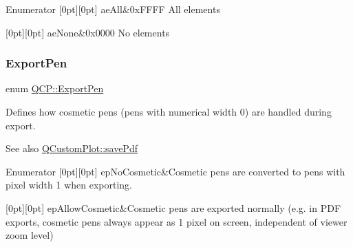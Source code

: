 \begin{DoxyEnumFields}{Enumerator}
[0pt][0pt]{}\mbox{\label{namespace_q_c_p_ae55dbe315d41fe80f29ba88100843a0caa897c232a0ffc8368e7c100ffc59ef31}} 
ae\+All&{\ttfamily 0x\+F\+F\+FF} All elements \\
\hline

[0pt][0pt]{}\mbox{\label{namespace_q_c_p_ae55dbe315d41fe80f29ba88100843a0caa9e90d81896358757d94275aeaa58f6a}} 
ae\+None&{\ttfamily 0x0000} No elements \\
\hline

\end{DoxyEnumFields}
\mbox{\label{namespace_q_c_p_a17844f19e1019693a953e1eb93536d2f}} 
\subsubsection{\texorpdfstring{ExportPen}{ExportPen}}
{\footnotesize\ttfamily enum \mbox{\hyperlink{namespace_q_c_p_a17844f19e1019693a953e1eb93536d2f}{Q\+C\+P\+::\+Export\+Pen}}}

Defines how cosmetic pens (pens with numerical width 0) are handled during export.

\begin{DoxySeeAlso}{See also}
\mbox{\hyperlink{class_q_custom_plot_ad5acd34f6b39c3516887d7e54fec2412}{Q\+Custom\+Plot\+::save\+Pdf}} 
\end{DoxySeeAlso}
\begin{DoxyEnumFields}{Enumerator}
[0pt][0pt]{}\mbox{\label{namespace_q_c_p_a17844f19e1019693a953e1eb93536d2faae8fcfaafee234ce18558afef83f6a78}} 
ep\+No\+Cosmetic&Cosmetic pens are converted to pens with pixel width 1 when exporting. \\
\hline

[0pt][0pt]{}\mbox{\label{namespace_q_c_p_a17844f19e1019693a953e1eb93536d2fa50d3657dba3fb90560b93a823cb0a6e8}} 
ep\+Allow\+Cosmetic&Cosmetic pens are exported normally (e.\+g. in P\+DF exports, cosmetic pens always appear as 1 pixel on screen, independent of viewer zoom level) \\
\hline

\end{DoxyEnumFields}
\mbox{\label{namespace_q_c_p_a2ad6bb6281c7c2d593d4277b44c2b037}} 
